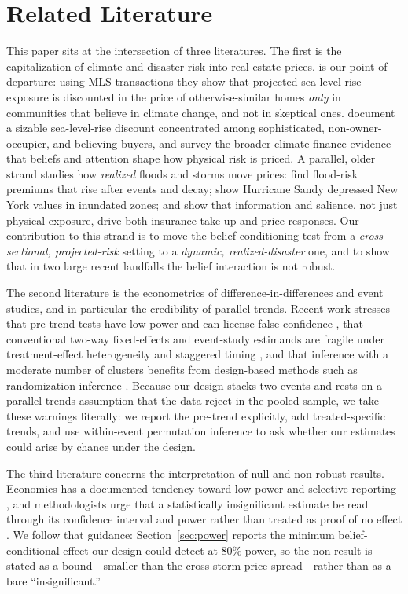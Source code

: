 \documentclass[12pt]{article}
\begin{document}
\section{Related Literature}\label{sec:lit}
This paper sits at the intersection of three literatures. The first is the capitalization of
climate and disaster risk into real-estate prices. \citet{baldauf2020} is our point of
departure: using MLS transactions they show that projected sea-level-rise exposure is
discounted in the price of otherwise-similar homes \emph{only} in communities that believe in
climate change, and not in skeptical ones. \citet{bernstein2019} document a sizable
sea-level-rise discount concentrated among sophisticated, non-owner-occupier, and believing
buyers, and \citet{giglio2021} survey the broader climate-finance evidence that beliefs and
attention shape how physical risk is priced. A parallel, older strand studies how \emph{realized}
floods and storms move prices: \citet{bin2013} find flood-risk premiums that rise after events
and decay; \citet{ortega2018} show Hurricane Sandy depressed New York values in inundated
zones; \citet{gallagher2014} and \citet{hino2021} show that information and salience, not just
physical exposure, drive both insurance take-up and price responses. Our contribution to this
strand is to move the belief-conditioning test from a \emph{cross-sectional, projected-risk}
setting to a \emph{dynamic, realized-disaster} one, and to show that in two large recent
landfalls the belief interaction is not robust.

The second literature is the econometrics of difference-in-differences and event studies, and in
particular the credibility of parallel trends. Recent work stresses that pre-trend tests have low
power and can license false confidence \citep{roth2022}, that conventional two-way
fixed-effects and event-study estimands are fragile under treatment-effect heterogeneity and
staggered timing \citep{callaway2021,goodmanbacon2021,sunabraham2021}, and that inference with a
moderate number of clusters benefits from design-based methods such as randomization inference
\citep{young2019}. Because our design stacks two events and rests on a parallel-trends assumption
that the data reject in the pooled sample, we take these warnings literally: we report the
pre-trend explicitly, add treated-specific trends, and use within-event permutation inference to
ask whether our estimates could arise by chance under the design.

The third literature concerns the interpretation of null and non-robust results. Economics has a
documented tendency toward low power and selective reporting \citep{ioannidis2017}, and
methodologists urge that a statistically insignificant estimate be read through its confidence
interval and power rather than treated as proof of no effect \citep{abadie2020}. We follow that
guidance: Section~\ref{sec:power} reports the minimum belief-conditional effect our design could
detect at 80\% power, so the non-result is stated as a bound---smaller than the cross-storm price
spread---rather than as a bare ``insignificant.''
\end{document}
